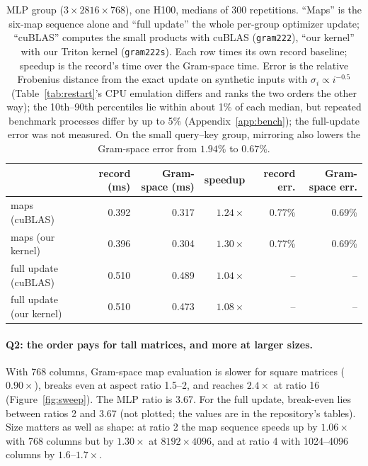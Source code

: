 \documentclass{article}
\begin{document}
\begin{table}[!htbp]\centering\small
\begin{tabular}{lrrrrr}\toprule
 & record (ms) & Gram-space (ms) & speedup & record err. & Gram-space err.\\\midrule
maps (cuBLAS) & 0.392 & 0.317 & $1.24\times$ & 0.77\% & 0.69\%\\
maps (our kernel) & 0.396 & 0.304 & $1.30\times$ & 0.77\% & 0.69\%\\
full update (cuBLAS) & 0.510 & 0.489 & $1.04\times$ & -- & --\\
full update (our kernel) & 0.510 & 0.473 & $1.08\times$ & -- & --\\\bottomrule
\end{tabular}
\caption{MLP group ($3\times2816\times768$), one H100, medians of 300 repetitions. ``Maps'' is the six-map sequence alone and ``full update'' the whole per-group optimizer update; ``cuBLAS'' computes the small products with cuBLAS (\texttt{gram222}), ``our kernel'' with our Triton kernel (\texttt{gram222s}). Each row times its own record baseline; speedup is the record's time over the Gram-space time. Error is the relative Frobenius distance from the exact update on synthetic inputs with $\sigma_i\propto i^{-0.5}$ (Table~\ref{tab:restart}'s CPU emulation differs and ranks the two orders the other way); the 10th--90th percentiles lie within about 1\% of each median, but repeated benchmark processes differ by up to 5\% (Appendix~\ref{app:bench}); the full-update error was not measured. On the small query--key group, mirroring also lowers the Gram-space error from $1.94\%$ to $0.67\%$.}\label{tab:bench}
\end{table}



\paragraph{Q2: the order pays for tall matrices, and more at larger sizes.} With 768 columns, Gram-space map evaluation is slower for square matrices ($0.90\times$), breaks even at aspect ratio 1.5--2, and reaches $2.4\times$ at ratio 16 (Figure~\ref{fig:sweep}). The MLP ratio is 3.67. For the full update, break-even lies between ratios 2 and 3.67 (not plotted; the values are in the repository's tables). Size matters as well as shape: at ratio 2 the map sequence speeds up by $1.06\times$ with 768 columns but by $1.30\times$ at $8192\times4096$, and at ratio 4 with 1024--4096 columns by $1.6$--$1.7\times$.
\end{document}
